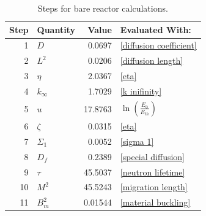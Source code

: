 \documentclass{anstrans}
\begin{document}
    \begin{table}
        \centering
        \begin{tabular}{rlrl}
            \toprule
            \textbf{Step} & \textbf{Quantity} & \textbf{Value} & \textbf{Evaluated With:} \\
            \midrule
            1 & $D$ & 0.0697 & \cref{diffusion coefficient}
            \\
            2 & $L^2$ & 0.0206 & \cref{diffusion length}
            \\
            3 & $\eta$ & 2.0367 & \cref{eta}
            \\
            4 & $k_{\infty}$ & 1.7029 & \cref{k inifinity}
            \\
            5 & $u$ & 17.8763 & $ \ln \left( \frac{E_0}{E_{th}} \right)$
            \\
            6 & $\zeta$ & 0.0315 & \cref{eta}
            \\
            7 & $\Sigma_1$ & 0.0052 & \cref{sigma 1}
            \\
            8 & $D_f$ & 0.2389 & \cref{special diffusion}
            \\
            9 & $\tau$ & 45.5037 & \cref{neutron lifetime}
            \\
            10 & $M^2$ & 45.5243 & \cref{migration length}
            \\
            11 & $B^2_m$ & 0.01544 & \cref{material buckling}
            \\
            \bottomrule
        \end{tabular}
        \caption{Steps for bare reactor calculations.}
        \label{tab: bare reactor calcs}
    \end{table}
\end{document}
